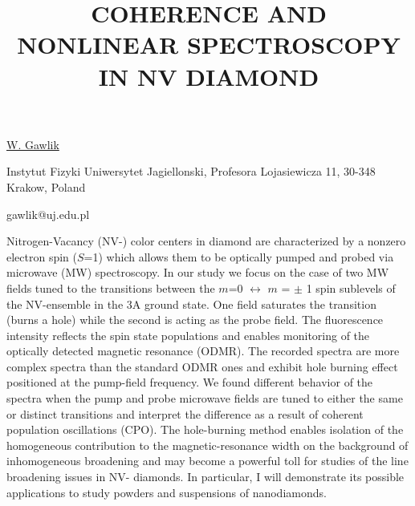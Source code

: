 \title{COHERENCE AND NONLINEAR SPECTROSCOPY IN NV DIAMOND}

\underline{W. Gawlik} 

{\normalsize{\vspace{-4mm}
Instytut Fizyki Uniwersytet Jagiellonski,
Profesora Lojasiewicza 11,
30-348 Krakow, Poland

\email gawlik@uj.edu.pl}}

Nitrogen-Vacancy (NV-) color centers in diamond are characterized by a nonzero electron spin ($S$=1) which allows them to be optically pumped and probed via microwave (MW) spectroscopy. In our study we focus on the case of two MW fields tuned to the transitions between the $m$=0 $\leftrightarrow$ $m$ = $\pm$ 1 spin sublevels of the NV-ensemble in the 3A ground state. One field saturates the transition (burns a hole) while the second is acting as the probe field. The fluorescence intensity reflects the spin state populations and enables monitoring of the optically detected magnetic resonance (ODMR). The recorded spectra are more complex spectra than the standard ODMR ones and exhibit hole burning effect positioned at the pump-field frequency. We found different behavior of the spectra when the pump and probe microwave fields are tuned to either the same or distinct transitions and interpret the difference as a result of coherent population oscillations (CPO). The hole-burning method enables isolation of the homogeneous contribution to the magnetic-resonance width on the background of inhomogeneous broadening and may become a powerful toll for studies of the line broadening issues in NV- diamonds. In particular, I will demonstrate its possible applications to study powders and suspensions of nanodiamonds.

\vspace{\baselineskip}
